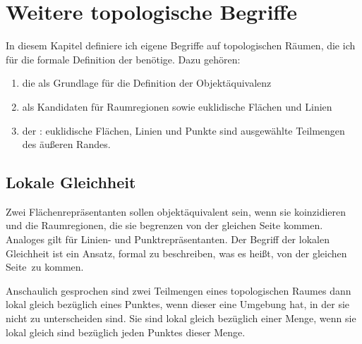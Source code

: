 \chapter{Weitere topologische Begriffe}\label{chap:topologie-erweiterung}

In diesem Kapitel definiere ich 
eigene Begriffe auf topologischen Räumen,
die ich für die formale Definition der \strukt benötige.
Dazu gehören:
\begin{enumerate}
    \item die  als Grundlage für die Definition der Objektäquivalenz
    \item {} als Kandidaten für Raumregionen sowie euklidische Flächen und Linien
    \item der : euklidische Flächen, Linien und Punkte sind ausgewählte Teilmengen des äußeren Randes.
\end{enumerate}


    


\section{Lokale Gleichheit}\label{sec:lokale-gleichheit}
    Zwei
    Flächenrepräsentanten sollen objektäquivalent sein, 
    wenn sie koinzidieren und die Raumregionen, die sie begrenzen \glqq von der gleichen Seite kommen\grqq. 
    Analoges gilt für Linien- und Punktrepräsentanten. 
    Der Begriff der lokalen Gleichheit ist ein Ansatz, formal zu beschreiben, was es heißt, \glqq von der gleichen Seite\grqq\ zu kommen.
    
    Anschaulich gesprochen sind zwei Teilmengen eines topologischen Raumes dann lokal gleich bezüglich eines Punktes, wenn dieser eine Umgebung hat, in der sie nicht zu unterscheiden sind.
    Sie sind lokal gleich bezüglich einer Menge, wenn sie lokal gleich sind bezüglich jeden Punktes dieser Menge.
    
